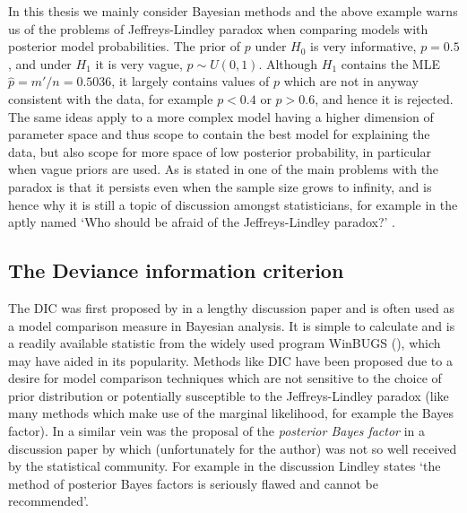 In this thesis we mainly consider Bayesian methods and the above example warns us of the problems of Jeffreys-Lindley
paradox when comparing models with posterior model probabilities. The prior of \(p\) under \(H_0\) is very informative,
\(p=0.5\), and under \(H_1\) it is very vague, \(p \sim U(0, 1)\). Although \(H_1\) contains the \gls{MLE} \(\hat{p} =
m'/n = 0.5036\), it largely contains values of \(p\) which are not in anyway consistent with the data, for example \(p <
0.4\) or \(p > 0.6\), and hence it is rejected. The same ideas apply to a more complex model having a higher dimension
of parameter space and thus scope to contain the best model for explaining the data, but also scope for more space of
low posterior probability, in particular when vague priors are used. As is stated in \cite{robert2014} one of the main
problems with the paradox is that it persists even when the sample size grows to infinity, and is hence why it is still
a topic of discussion amongst statisticians, for example in the aptly named `Who should be afraid of the
Jeffreys-Lindley paradox?' \cite{spanos2013}.

\subsection{The Deviance information criterion}
\label{sec:Deviance information criterion}

The \gls{DIC} was first proposed by \cite{spiegelhalter2002} in a lengthy discussion paper and is often used as a model
comparison measure in Bayesian analysis. It is simple to calculate and is a readily available statistic from the widely
used program WinBUGS (\cite{WinBUGS}), which may have aided in its popularity. Methods like \gls{DIC} have been
proposed due to a desire for model comparison techniques which are not sensitive to the choice of prior distribution or
potentially susceptible to the Jeffreys-Lindley paradox (like many methods which make use of the marginal likelihood,
for example the Bayes factor). In a similar vein was the proposal of the \textit{posterior Bayes factor} in a discussion
paper by \cite{aitkin1991} which (unfortunately for the author) was not so well received by the statistical community.
For example in the discussion Lindley states `the method of posterior Bayes factors is seriously flawed and cannot be
recommended'.

